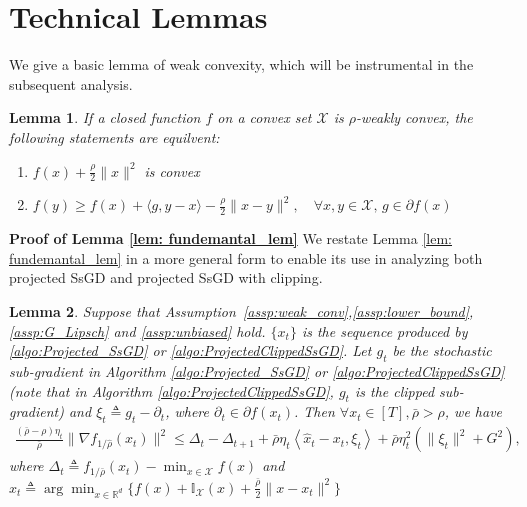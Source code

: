 \documentclass{article}
\newtheorem{lemma}{Lemma}
\def \X {\mathcal{X}}
\def \R {\mathbb{R}}
\def \brho {\bar{\rho}}
\def \hx {\hat{x}}
\begin{document}
\section{Technical Lemmas}
We give a basic lemma of weak convexity, which will be instrumental in the subsequent analysis.
\begin{lemma}\label{lem:weakly_convex}
    If a closed function $f$ on a convex set $\X$ is $\rho$-weakly convex, the following statements are equilvent:
    \begin{enumerate}
        \item $f(x)+\frac{\rho}{2}\|x\|^2$ is convex
        \item $f(y)\geq f(x)+\langle g,y-x\rangle-\frac{\rho}{2}\|x-y\|^2,\quad\forall x,y\in\X,\, g\in\partial f(x)$
    \end{enumerate}
\end{lemma}
\textbf{Proof of Lemma \ref{lem: fundemantal_lem}}
We restate Lemma \ref{lem: fundemantal_lem} in a more general form to enable its use in analyzing both projected SsGD and projected SsGD with clipping.
\begin{lemma}\label{app_lem:fundamental_lem}
    Suppose that Assumption~\ref{assp:weak_conv},\ref{assp:lower_bound}, \ref{assp:G_Lipsch} and \ref{assp:unbiased} hold. $\{x_t\}$ is the sequence produced by \ref{algo:Projected_SsGD} or \ref{algo:ProjectedClippedSsGD}. Let $g_t$ be the stochastic sub-gradient in Algorithm \ref{algo:Projected_SsGD} or \ref{algo:ProjectedClippedSsGD} (note that in Algorithm \ref{algo:ProjectedClippedSsGD}, $g_t$ is the clipped sub-gradient) and $\xi_t\triangleq g_t-\partial_t$, where $\partial_t\in\partial f(x_t)$. Then $\forall x_t\in[T],\brho>\rho$, we have
    \begin{align}\label{app_eq:fundemental_lemma}
        \frac{(\bar{\rho}-\rho)\eta_t}{\bar{\rho}}\|\nabla f_{1/\hat{\rho}}(x_t)\|^2 \leq \Delta_t-\Delta_{t+1}+\bar{\rho}\eta_t\left\langle\hat{x}_t-x_t,\xi_t\right\rangle+\bar{\rho}\eta_t^2(\|\xi_t\|^2+G^2),
    \end{align}
    where $\Delta_t\triangleq f_{1/\brho}(x_t)-\min_{x\in\X} f(x)$ and $\hx_t\triangleq \arg\min_{x\in\R^d}\{f(x)+\mathbb{I}_\X(x)+\frac{\brho}{2}\|x-x_t\|^2\}$
\end{lemma}
\end{document}
